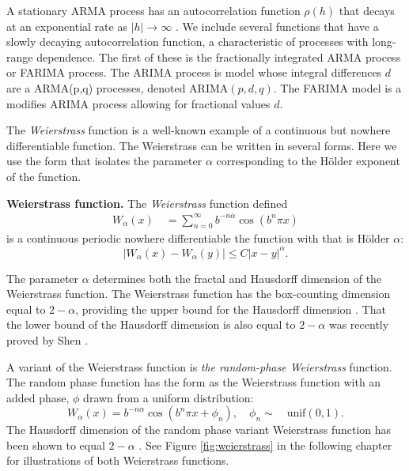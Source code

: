 A stationary ARMA process has an autocorrelation  
function $\rho(h)$ that decays at an exponential rate 
as $|h| \to \infty$ \cite{fan2003}.   
We include several functions that have a slowly decaying 
autocorrelation function, a characteristic of processes with long-range dependence. The first of these is the fractionally integrated ARMA process or FARIMA process. 
The ARIMA process is model whose integral 
differences $d$ are a ARMA(p,q) processes,
denoted ARIMA$(p,d,q)$.  
The FARIMA model is a modifies ARIMA process
allowing for fractional values $d$\cite{fan2003}.

The \textit{Weierstrass} function is 
a well-known example of a continuous but nowhere differentiable function. The Weierstrass can be written in several forms. Here we use the form that isolates the parameter $\alpha$ corresponding to the H\"older exponent of the function. 
\begin{defn}\textbf{Weierstrass function.} \label{def:weierstrass}
  The \textit{Weierstrass} function defined
  \begin{align}
    W_{\alpha}(x) 
  \hspace{1em}= \sum_{n = 0}^{\infty} b^{-n \alpha} \cos(b^n \pi x)
  \end{align}
  is a continuous 
  periodic nowhere differentiable the function with 
  that is H\"older $\alpha$:  
  \[
  \left| W_{\alpha}(x) - W_{\alpha}(y) \right| 
  \leq C \left| x - y \right|^{\alpha}.
\]  
\end{defn}
The parameter $\alpha$ determines both the fractal and 
Hausdorff dimension of the Weierstrass function. 
The Weierstrass function has the box-counting dimension equal to $2-\alpha$, providing the upper bound for the Hausdorff dimension \cite{falconer2003}. That the lower bound of the Hausdorff dimension is also equal to $2-\alpha$ was recently proved by Shen \cite{shen2015}. 


A variant of the Weierstrass function is \textit{ the random-phase 
Weierstrass} function.
The random phase function has the form as the 
Weierstrass function with an added phase, $\phi$ drawn from 
a uniform distribution:
\[
  W_{\alpha}(x) 
   = b^{-n \alpha} \cos(b^n \pi x  + \phi_n), \hspace{1em} 
   \phi_n \sim \hspace{1em} \text{unif}(0,1).
\] 
The Hausdorff dimension of the random phase variant Weierstrass function has been shown to equal $2- \alpha$ \cite{hunt1998}. 
See Figure \ref{fig:weierstrass} in the following chapter 
for illustrations of both Weierstrass functions.

